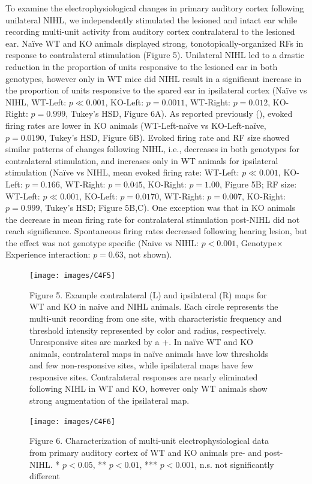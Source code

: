 To examine the electrophysiological changes in primary auditory cortex following unilateral NIHL, we independently stimulated the lesioned and intact ear while recording multi-unit activity from auditory cortex contralateral to the lesioned ear. Na\"ive WT and KO animals displayed strong, tonotopically-organized RFs in response to contralateral stimulation (Figure 5). Unilateral NIHL led to a drastic reduction in the proportion of units responsive to the lesioned ear in both genotypes, however only in WT mice did NIHL result in a significant increase in the proportion of units responsive to the spared ear in ipsilateral cortex (Na\"ive vs NIHL, WT-Left: $p\ll0.001$, KO-Left: $p=0.0011$, WT-Right: $p=0.012$, KO-Right: $p=0.999$, Tukey's HSD, Figure 6A). As reported previously (\cite{Yang2013}), evoked firing rates are lower in KO animals (WT-Left-na\"ive vs KO-Left-na\"ive, $p=0.0190$, Tukey's HSD, Figure 6B). Evoked firing rate and RF size showed similar patterns of changes following NIHL, i.e., decreases in both genotypes for contralateral stimulation, and increases only in WT animals for ipsilateral stimulation (Na\"ive vs NIHL, mean evoked firing rate: WT-Left: $p\ll0.001$, KO-Left: $p=0.166$, WT-Right: $p=0.045$, KO-Right: $p=1.00$, Figure 5B; RF size: WT-Left: $p\ll0.001$, KO-Left: $p=0.0170$, WT-Right: $p=0.007$, KO-Right: $p=0.999$, Tukey's HSD; Figure 5B,C). One exception was that in KO animals the decrease in mean firing rate for contralateral stimulation post-NIHL did not reach significance. Spontaneous firing rates decreased following hearing lesion, but the effect was not genotype specific (Na\"ive vs NIHL: $p<0.001$, Genotype$\times$Experience interaction: $p=0.63$, not shown).

\begin{figure}
	\centering
		\texttt{[image: images/C4F5]}
	\begin{changemargin}{1in}{1in}
	\footnotesize{Figure 5. Example contralateral (L) and ipsilateral (R) maps for WT and KO in na\"ive and NIHL animals. Each circle represents the multi-unit recording from one site, with characteristic frequency and threshold intensity represented by color and radius, respectively. Unresponsive sites are marked by a +. In na\"ive WT and KO animals, contralateral maps in na\"ive animals have low thresholds and few non-responsive sites, while ipsilateral maps have few responsive sites. Contralateral responses are nearly eliminated following NIHL in WT and KO, however only WT animals show strong augmentation of the ipsilateral map.}
	\end{changemargin}
\end{figure}


\begin{figure}
	\centering
		\texttt{[image: images/C4F6]}
	\begin{changemargin}{1in}{1in}
	\footnotesize{Figure 6. Characterization of multi-unit electrophysiological data from primary auditory cortex of WT and KO animals pre- and post-NIHL. * $p<0.05$, ** $p<0.01$, *** $p<0.001$, n.s. not significantly different}
	\end{changemargin}
\end{figure}

\printbibliography